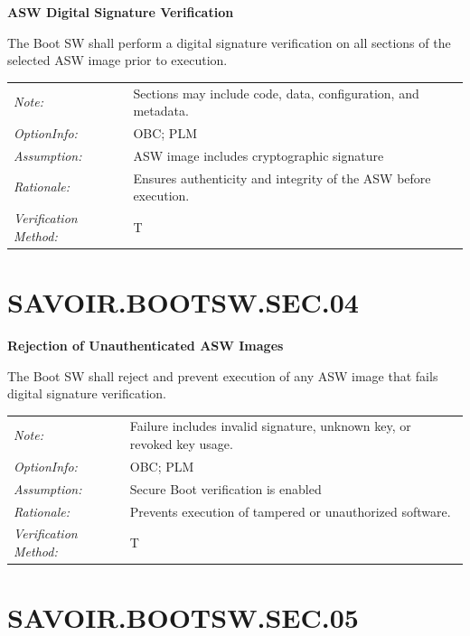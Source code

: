 \textbf{ASW Digital Signature Verification}

The Boot SW shall perform a digital signature verification on all sections of the selected ASW image prior to execution.

\vspace{6pt}

\begin{tabularx}{\textwidth}{@{}lX@{}}
\textit{Note:} & Sections may include code, data, configuration, and metadata. \\[6pt]
\textit{OptionInfo:} & OBC; PLM \\[6pt]
\textit{Assumption:} & ASW image includes cryptographic signature \\[6pt]
\textit{Rationale:} & Ensures authenticity and integrity of the ASW before execution. \\[6pt]
\textit{Verification Method:} & T \\[6pt]
\end{tabularx}

\headrule

\section*{SAVOIR.BOOTSW.SEC.04}

\textbf{Rejection of Unauthenticated ASW Images}

The Boot SW shall reject and prevent execution of any ASW image that fails digital signature verification.

\vspace{6pt}

\begin{tabularx}{\textwidth}{@{}lX@{}}
\textit{Note:} & Failure includes invalid signature, unknown key, or revoked key usage. \\[6pt]
\textit{OptionInfo:} & OBC; PLM \\[6pt]
\textit{Assumption:} & Secure Boot verification is enabled \\[6pt]
\textit{Rationale:} & Prevents execution of tampered or unauthorized software. \\[6pt]
\textit{Verification Method:} & T \\[6pt]
\end{tabularx}

\headrule

\section*{SAVOIR.BOOTSW.SEC.05}

